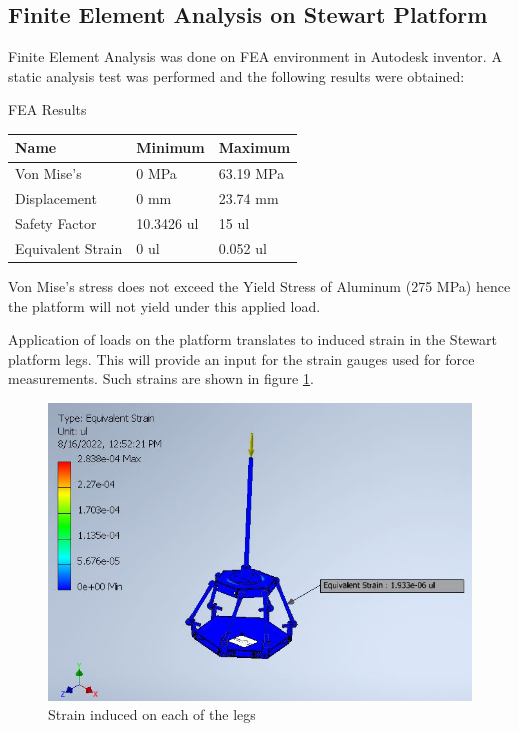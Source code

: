 \subsection{Finite Element Analysis on Stewart Platform}
Finite Element Analysis was done on FEA environment in Autodesk inventor. A static analysis test was performed and the following results were obtained:
\begin{table}[!h]
\caption{FEA Results}
\end{table}
\begin{center}
\begin{tabular}{|l|l|l|}
\hline
\textbf{Name} & \textbf{Minimum} & \textbf{Maximum}\\
\hline
Von Mise's & 0 MPa & 63.19 MPa\\
\hline
Displacement & 0 mm & 23.74 mm\\
\hline
Safety Factor & 10.3426 ul & 15 ul\\
\hline
Equivalent Strain & 0 ul & 0.052 ul\\
\hline
\end{tabular}
\end{center}
Von Mise's stress does not exceed the Yield Stress of Aluminum (275 MPa) hence the platform will not yield under this applied load.

Application of loads on the platform translates to induced strain in the Stewart platform legs. This will provide an input for the strain gauges used for force measurements. Such strains are shown in figure \ref{eq}.
\begin{center}
	\begin{figure}[!htb]
	\centering
	\includegraphics[width=0.6\linewidth]{Figures/Equivalent}
	\caption[Equivalent strain]{Strain induced on each of the legs}
	\label{eq}
	\end{figure}
\end{center}
